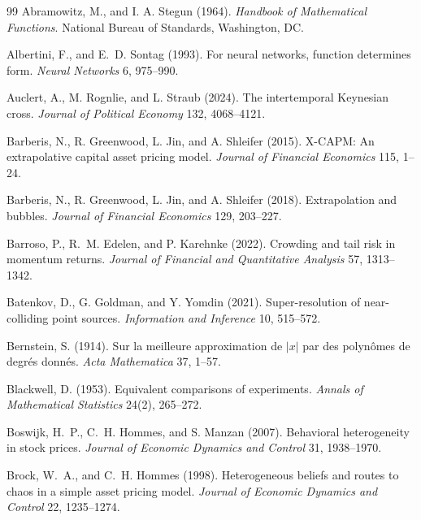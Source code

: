 \documentclass[12pt]{article}
\theoremstyle{definition}
\theoremstyle{remark}
\begin{document}
\begin{thebibliography}{99}\setlength{\itemsep}{2pt}\small
{} Abramowitz, M., and I. A. Stegun (1964). \emph{Handbook of Mathematical Functions}. National Bureau of Standards, Washington, DC.

 Albertini, F., and E.~D. Sontag (1993). For neural networks, function determines form. \emph{Neural Networks} 6, 975--990.

 Auclert, A., M. Rognlie, and L. Straub (2024). The intertemporal Keynesian cross. \emph{Journal of Political Economy} 132, 4068--4121.

 Barberis, N., R. Greenwood, L. Jin, and A. Shleifer (2015). X-CAPM: An extrapolative capital asset pricing model. \emph{Journal of Financial Economics} 115, 1--24.

 Barberis, N., R. Greenwood, L. Jin, and A. Shleifer (2018). Extrapolation and bubbles. \emph{Journal of Financial Economics} 129, 203--227.

 Barroso, P., R.~M. Edelen, and P. Karehnke (2022). Crowding and tail risk in momentum returns. \emph{Journal of Financial and Quantitative Analysis} 57, 1313--1342.

 Batenkov, D., G. Goldman, and Y. Yomdin (2021). Super-resolution of near-colliding point sources. \emph{Information and Inference} 10, 515--572.

 Bernstein, S. (1914). Sur la meilleure approximation de $|x|$ par des polyn\^omes de degr\'es donn\'es. \emph{Acta Mathematica} 37, 1--57.

 Blackwell, D. (1953). Equivalent comparisons of experiments. \emph{Annals of Mathematical Statistics} 24(2), 265--272.

 Boswijk, H.~P., C.~H. Hommes, and S. Manzan (2007). Behavioral heterogeneity in stock prices. \emph{Journal of Economic Dynamics and Control} 31, 1938--1970.

 Brock, W.~A., and C.~H. Hommes (1998). Heterogeneous beliefs and routes to chaos in a simple asset pricing model. \emph{Journal of Economic Dynamics and Control} 22, 1235--1274.


\end{thebibliography}
\end{document}
